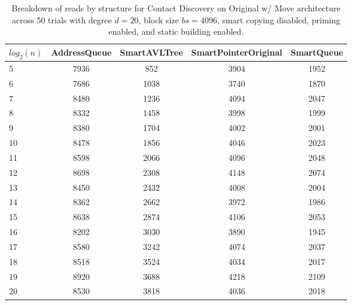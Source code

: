 \begin{table}[]
\centering
\begin{tabular}{|l|c|c|c|c|}
$log_2(n)$ & AddressQueue & SmartAVLTree & SmartPointerOriginal & SmartQueue \\ \hline
5 & 7936 & 852 & 3904 & 1952 \\ \hline
6 & 7686 & 1038 & 3740 & 1870 \\ \hline
7 & 8480 & 1236 & 4094 & 2047 \\ \hline
8 & 8332 & 1458 & 3998 & 1999 \\ \hline
9 & 8380 & 1704 & 4002 & 2001 \\ \hline
10 & 8478 & 1856 & 4046 & 2023 \\ \hline
11 & 8598 & 2066 & 4096 & 2048 \\ \hline
12 & 8698 & 2308 & 4148 & 2074 \\ \hline
13 & 8450 & 2432 & 4008 & 2004 \\ \hline
14 & 8362 & 2662 & 3972 & 1986 \\ \hline
15 & 8638 & 2874 & 4106 & 2053 \\ \hline
16 & 8202 & 3030 & 3890 & 1945 \\ \hline
17 & 8580 & 3242 & 4074 & 2037 \\ \hline
18 & 8518 & 3524 & 4034 & 2017 \\ \hline
19 & 8920 & 3688 & 4218 & 2109 \\ \hline
20 & 8530 & 3818 & 4036 & 2018 \\ \hline
\end{tabular}
\caption{Breakdown of reads by structure for Contact Discovery on Original w/ Move architecture across 50 trials with degree $d=20$, block size $bs=4096$, smart copying disabled, priming enabled, and static building enabled.}
    \label{tab:reads_by_structure_cd_d20_bs4096_trials50_copiesfalse_primetrue_staticinsertiontrue_ptoriginal_movetrue}
\end{table}

